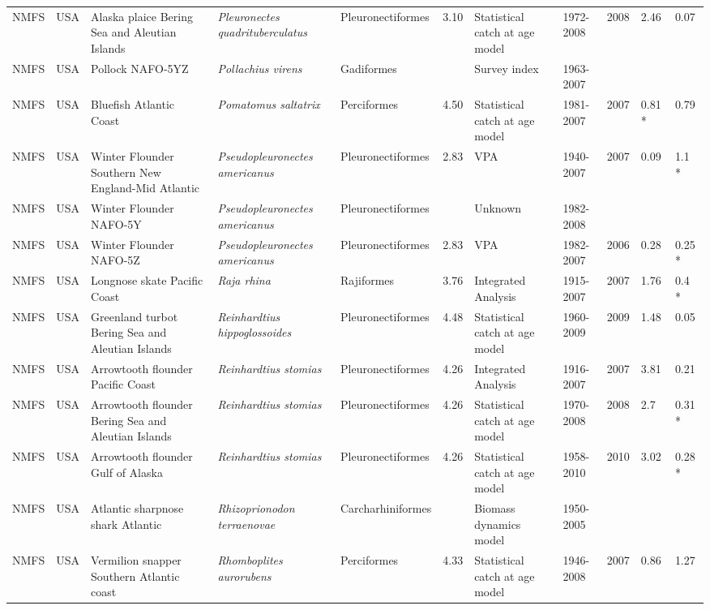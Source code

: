 \begin{longtable}{p{1.5cm}p{1.5cm}p{3cm}p{3cm}p{2.5cm}p{0.9cm}p{1.4cm}p{0.9cm}p{0.9cm}p{0.9cm}p{1cm}}
  NMFS & USA & Alaska plaice Bering Sea and Aleutian Islands & \textit{Pleuronectes quadrituberculatus} & Pleuronectiformes & 3.10 & Statistical catch at age model & 1972-2008 & 2008 & 2.46 & 0.07 \\ 
  NMFS & USA & Pollock NAFO-5YZ & \textit{Pollachius virens} & Gadiformes &  & Survey index & 1963-2007 &  &  &  \\ 
  NMFS & USA & Bluefish Atlantic Coast & \textit{Pomatomus saltatrix} & Perciformes & 4.50 & Statistical catch at age model & 1981-2007 & 2007 & 0.81 * & 0.79 \\ 
  NMFS & USA & Winter Flounder Southern New England-Mid Atlantic & \textit{Pseudopleuronectes americanus} & Pleuronectiformes & 2.83 & VPA & 1940-2007 & 2007 & 0.09 & 1.1 * \\ 
  NMFS & USA & Winter Flounder NAFO-5Y & \textit{Pseudopleuronectes americanus} & Pleuronectiformes &  & Unknown & 1982-2008 &  &  &  \\ 
  NMFS & USA & Winter Flounder NAFO-5Z & \textit{Pseudopleuronectes americanus} & Pleuronectiformes & 2.83 & VPA & 1982-2007 & 2006 & 0.28 & 0.25 * \\ 
  NMFS & USA & Longnose skate Pacific Coast & \textit{Raja rhina} & Rajiformes & 3.76 & Integrated Analysis & 1915-2007 & 2007 & 1.76 & 0.4 * \\ 
  NMFS & USA & Greenland turbot Bering Sea and Aleutian Islands & \textit{Reinhardtius hippoglossoides} & Pleuronectiformes & 4.48 & Statistical catch at age model & 1960-2009 & 2009 & 1.48 & 0.05 \\ 
  NMFS & USA & Arrowtooth flounder Pacific Coast & \textit{Reinhardtius stomias} & Pleuronectiformes & 4.26 & Integrated Analysis & 1916-2007 & 2007 & 3.81 & 0.21 \\ 
  NMFS & USA & Arrowtooth flounder Bering Sea and Aleutian Islands & \textit{Reinhardtius stomias} & Pleuronectiformes & 4.26 & Statistical catch at age model & 1970-2008 & 2008 & 2.7 & 0.31 * \\ 
  NMFS & USA & Arrowtooth flounder Gulf of Alaska & \textit{Reinhardtius stomias} & Pleuronectiformes & 4.26 & Statistical catch at age model & 1958-2010 & 2010 & 3.02 & 0.28 * \\ 
  NMFS & USA & Atlantic sharpnose shark Atlantic & \textit{Rhizoprionodon terraenovae} & Carcharhiniformes &  & Biomass dynamics model & 1950-2005 &  &  &  \\ 
  NMFS & USA & Vermilion snapper Southern Atlantic coast & \textit{Rhomboplites aurorubens} & Perciformes & 4.33 & Statistical catch at age model & 1946-2008 & 2007 & 0.86 & 1.27 \\ 

\end{longtable}
